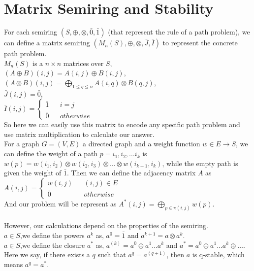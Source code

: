 \documentclass[a4paper,12pt,twoside,openright]{report}
\begin{document}
\section{Matrix Semiring and Stability}
For each semiring $(S,\oplus,\otimes,\bar0,\bar1)$ (that represent the rule of a path problem), we can define a matrix semiring $(M_n(S),\oplus,\otimes,\bar{J},\bar{I})$ to represent the concrete path problem.\\
$M_n(S)$ is a $n\times n$ matrices over $S$,\\
$(A \oplus B)(i,j) = A(i,j)\oplus B(i,j)$,\\
$(A \otimes B)(i,j) = \bigoplus_{1\leq q \leq n}A(i,q)\otimes B(q,j)$,\\
$\bar{J}(i,j) = \bar0$,\\
$\bar{I}(i,j)=\left\{
\begin{array}{rcl}
\bar1       &      & {i = j}\\
\bar0     &      & {otherwise}
\end{array} \right.$\\
So here we can easily use this matrix to encode any specific path problem and use matrix multiplication to calculate our answer. \\
For a graph $G = (V,E)$ a directed graph and a weight function $w \in E \rightarrow S$, 
we can define the weight of a path $p = i_1,i_2, \dots i_k$ is $w(p) = w (i_1,i_2) \otimes w(i_2,i_3)\otimes \dots \otimes w(i_{k-1},i_k)$, while the empty path is given the weight of $\bar1$.
Then we can define the adjacency matrix $A$ as 
$A(i,j)=\left\{
\begin{array}{rcl}
w(i,j)      &      & {(i,j)\in E}\\
\bar0     &      & {otherwise}
\end{array} \right.$\\
And our problem will be represent as $A^*(i,j) = \bigoplus_{p \in \pi (i,j)}w(p)$.\\\\
However, our calculations depend on the properties of the semiring.\\
$a\in S$,we define the powers $a^k$ as, $a^0 = \bar{1}$ and $a^{k+1} = a \otimes a^k$.\\
$a\in S$,we define the closure $a^*$ as, $a^{(k)} = a^0 \oplus a^1 \dots  a^k$ and $a^* = a^0 \oplus a^1 \dots  a^k \oplus \dots$.\\
Here we say, if there exists a $q$ such that $a^{q} = a^{(q+1)}$, then $a$ is q-stable, which means $a^{q} = a^*$.\\
\end{document}
